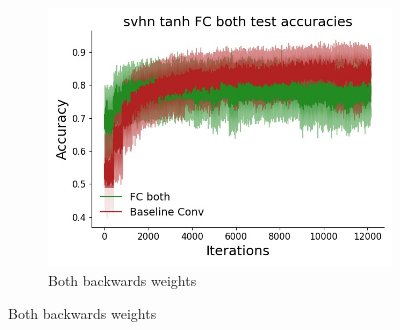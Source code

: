\begin{figure}[htb]
\begin{subfigure}{0.25\textwidth}
  \includegraphics[width=\linewidth]{chapter_6_figures/AR/svhn_tanh_FC_both_test_accuracies_prelim_1.jpg}
  \caption{Both backwards weights}
\end{subfigure}


\end{figure}
